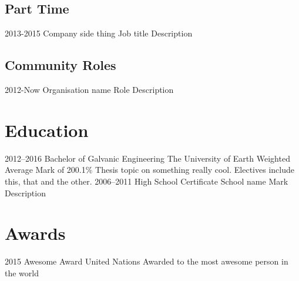 \documentclass[]{friggeri-cv}
\begin{document}
    \subsection{Part Time}
        \begin{entrylist}
            \entry
                {2013-2015}
                {Company} 
                {side thing}
                {Job title}
                {Description}
        \end{entrylist}
    \subsection{Community Roles}
        \begin{entrylist}
            \entry
                {2012-Now}
                {Organisation name} 
                {}
                {Role}
                {Description}
        \end{entrylist}

\section{Education}
    \begin{entrylist} 
        \entry
            {2012--2016}
            {Bachelor {\normalfont of Galvanic Engineering}}
            {The University of Earth}
            {Weighted Average Mark of 200.1\%}
            {
                Thesis topic on something really cool. Electives include this, that and the other.
            }
        \entry
            {2006--2011}  
            {High School Certificate}
            {School name}
            {Mark} 
            {
                Description
            }
    \end{entrylist}

\section{Awards}
\begin{entrylist}
    \entry
        {2015}
        {Awesome Award}
        {United Nations} 
        {} 
        {Awarded to the most awesome person in the world}
\end{entrylist}
\end{document}
